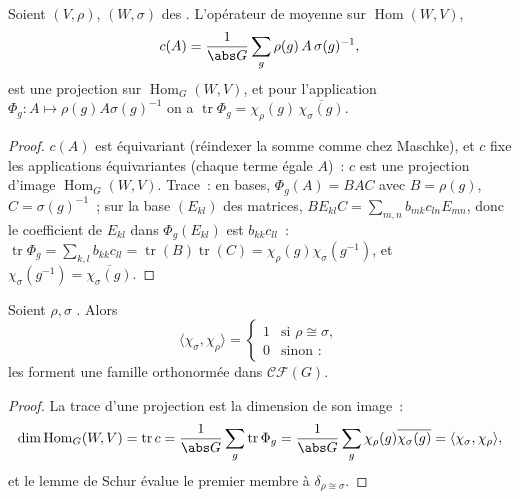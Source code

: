 \begin{lemma}\label{lem:b3:representations:homtrace}
Soient $(V, \rho)$, $(W, \sigma)$ des .
L'opérateur de moyenne sur $\operatorname{Hom}(W, V)$,
\[
c(A) = \frac1{\abs G}\sum_{g}\rho(g)\,A\,\sigma(g)^{-1},
\]
est une projection sur $\operatorname{Hom}_G(W, V)$, et pour
l'application $\Phi_g \colon A \mapsto \rho(g)A\sigma(g)^{-1}$
on a $\operatorname{tr}\Phi_g =
\chi_\rho(g)\,\overline{\chi_\sigma(g)}$.
\end{lemma}

\begin{proof}
$c(A)$ est équivariant (réindexer la somme comme chez Maschke),
et $c$ fixe les applications équivariantes (chaque terme égale
$A$)~: $c$ est une projection d'image $\operatorname{Hom}_G(W,
V)$. Trace~: en bases, $\Phi_g(A) = BAC$ avec $B = \rho(g)$, $C
= \sigma(g)^{-1}$~; sur la base $(E_{kl})$ des matrices,
$BE_{kl}C = \sum_{m,n} b_{mk}c_{ln}E_{mn}$, donc le coefficient
de $E_{kl}$ dans $\Phi_g(E_{kl})$ est $b_{kk}c_{ll}$~:
$\operatorname{tr}\Phi_g = \sum_{k,l}b_{kk}c_{ll} =
\operatorname{tr}(B) \operatorname{tr}(C) =
\chi_\rho(g)\chi_\sigma(g^{-1})$, et $\chi_\sigma(g^{-1}) =
\overline{\chi_\sigma(g)}$.
\end{proof}

\begin{theorem}
\label{thm:b3:representations:orthogonality}
Soient $\rho, \sigma$ \emph{}. Alors
\[
\langle\chi_\sigma, \chi_\rho\rangle =
\begin{cases}
1 & \text{si } \rho \cong \sigma,\\
0 & \text{sinon~:}
\end{cases}
\]
les   forment une famille orthonormée
dans $\mathcal{CF}(G)$.
\end{theorem}

\begin{proof}
La trace d'une projection est la dimension de son image~:
\[
\dim\operatorname{Hom}_G(W, V) = \operatorname{tr} c
= \frac1{\abs G}\sum_g \operatorname{tr}\Phi_g
= \frac1{\abs G}\sum_g \chi_\rho(g)\overline{\chi_\sigma(g)}
= \langle \chi_\sigma, \chi_\rho\rangle,
\]
et le lemme de Schur évalue le premier membre à $\delta_{\rho
\cong \sigma}$.
\end{proof}

